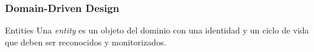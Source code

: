 \documentclass[a4paper,slidestop,xcolor=pst,dvips,blue]{beamer}
\begin{document}
%
%
\begin{frame}[c]
    \frametitle{Domain-Driven Design}
     \begin{block}{Entities}
        Una \emph{entity} es un objeto del dominio con una identidad y un ciclo de vida que deben ser reconocidos y monitorizados.
     \end{block}
\end{frame}
%
%
%
%
%
%
\end{document}

